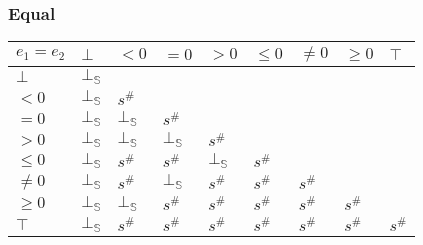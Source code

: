 \documentclass[aspectratio=169]{beamer}
\begin{document}
        \begin{frame}
            \frametitle{Equal}
\begin{table}
    \begin{tabular}{|l|l|l|l|l|l|l|l|l|}
    \hline
    $e_1 = e_2$ & $\bot$ & $<0$   & $=0$   & $>0$   & $\le 0$ & $\ne 0$ & $\ge 0$ & $\top$ \\ \hline
    $\bot$      & $\bot_\mathbb{S}$ &        &        &        &         &         &         &        \\ \hline
    $<0$        & $\bot_\mathbb{S}$ & $s^\#$ &        &        &         &         &         &        \\ \hline
    $=0$        & $\bot_\mathbb{S}$ & $\bot_\mathbb{S}$ & $s^\#$ &        &         &         &         &        \\ \hline
    $>0$        & $\bot_\mathbb{S}$ & $\bot_\mathbb{S}$ & $\bot_\mathbb{S}$ & $s^\#$ &         &         &         &        \\ \hline
    $\le 0$     & $\bot_\mathbb{S}$ & $s^\#$ & $s^\#$ & $\bot_\mathbb{S}$ & $s^\#$  &         &         &        \\ \hline
    $\ne 0$     & $\bot_\mathbb{S}$ & $s^\#$ & $\bot_\mathbb{S}$ & $s^\#$ & $s^\#$  & $s^\#$  &         &        \\ \hline
    $\ge 0$     & $\bot_\mathbb{S}$ & $\bot_\mathbb{S}$ & $s^\#$ & $s^\#$ & $s^\#$  & $s^\#$  & $s^\#$  &        \\ \hline
    $\top$      & $\bot_\mathbb{S}$ & $s^\#$ & $s^\#$ & $s^\#$ & $s^\#$  & $s^\#$  & $s^\#$  & $s^\#$ \\ \hline
    \end{tabular}
    \end{table}
\end{frame}
\end{document}
